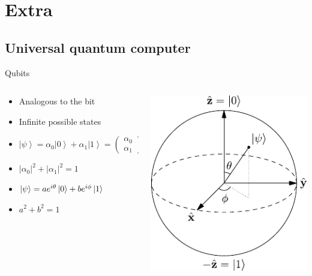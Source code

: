 \documentclass[14pt]{beamer}
\let\olditem\item
\renewcommand{\item}{%
\olditem\vspace{10pt}}
\begin{document}
\section{Extra}
\subsection{Universal quantum computer}
\begin{frame}{Qubits}
\begin{columns}[T]
	\begin{column}{.6\textwidth}
		\begin{block}{}
			\begin{itemize}
				\item Analogous to the bit
				\item Infinite possible states
				\item $ \left | \psi \right \rangle=\alpha _{0}\left | 0 \right \rangle+\alpha _{1}\left | 1 \right \rangle=\begin{pmatrix}\alpha_{0}\\ \alpha_{1}\end{pmatrix}$
				\item $ \left | \alpha_{0} \right |^{2} + \left | \alpha_{1} \right |^{2}=1$
				\item $\ket{\psi} = ae^{i\theta}\ket{0} + be^{i\phi}\ket{1}$
				\item $a^2 + b^2 = 1$
			\end{itemize}
    	\end{block}
	\end{column}
	\begin{column}{.4\textwidth}
    	\begin{block}{}
			\includegraphics[width=1\textwidth]{../resources/pdfs/Bloch_Sphere.pdf}

\end{block}
\end{column}
\end{columns}
\end{frame}
\end{document}
